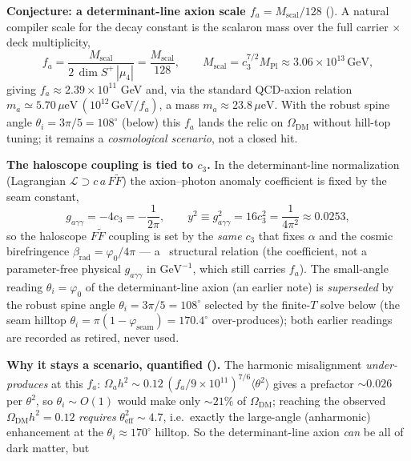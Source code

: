\documentclass[11pt,a4paper]{article}
\newcommand{\cthree}{c_3}
\newcommand{\Mpl}{M_{\mathrm{Pl}}}
\begin{document}
\par\smallskip\noindent\textbf{Conjecture: a determinant-line axion scale $f_a=M_{\mathrm{scal}}/128$} (\mC).
A natural compiler scale for the decay constant is the scalaron mass over the full carrier $\times$ deck
multiplicity,
\[
  f_a=\frac{M_{\mathrm{scal}}}{2\,\dim S^+\,|\mu_4|}=\frac{M_{\mathrm{scal}}}{128},\qquad
  M_{\mathrm{scal}}=\cthree^{7/2}\Mpl\approx3.06\times10^{13}\,\mathrm{GeV},
\]
giving $f_a\approx2.39\times10^{11}$ GeV and, via the standard QCD-axion relation
$m_a\simeq5.70\,\mu\mathrm{eV}\,(10^{12}\,\mathrm{GeV}/f_a)$, a mass $m_a\approx23.8\,\mu\mathrm{eV}$.
With the robust spine angle $\theta_i=3\pi/5=108^\circ$ (below) this $f_a$ lands the relic on
$\Omega_{\mathrm{DM}}$ without hill-top tuning; it remains a \emph{cosmological scenario}, not a closed
hit. 
\par\smallskip\noindent\textbf{The haloscope coupling is tied to $\cthree$.} In the determinant-line
normalization (Lagrangian $\mathcal L\supset c\,a\,F\tilde F$) the axion--photon anomaly coefficient is fixed
by the seam constant,
\[
  g_{a\gamma\gamma}=-4\cthree=-\frac{1}{2\pi},\qquad y^2\equiv g_{a\gamma\gamma}^2=16\cthree^2=\frac{1}{4\pi^2}\approx0.0253,
\]
so the haloscope $F\tilde F$ coupling is set by the \emph{same} $\cthree$ that fixes $\alpha$ and the cosmic
birefringence $\beta_{\mathrm{rad}}=\varphi_0/4\pi$ --- a \mC\ structural relation (the coefficient, not a
parameter-free physical $g_{a\gamma\gamma}$ in $\mathrm{GeV}^{-1}$, which still carries $f_a$). The
small-angle reading $\theta_i=\varphi_0$ of the determinant-line axion (an earlier note) is \emph{superseded}
by the robust spine angle $\theta_i=3\pi/5=108^\circ$ selected by the finite-$T$ solve below (the seam
hilltop $\theta_i=\pi(1-\varphi_{\mathrm{seam}})=170.4^\circ$ over-produces); both earlier readings are
recorded as retired, never used.
\par\smallskip\noindent\textbf{Why it stays a scenario, quantified ().}
The harmonic misalignment \emph{under-produces} at this $f_a$: $\Omega_a h^2\sim0.12\,(f_a/9{\times}10^{11})^{7/6}\langle\theta^2\rangle$
gives a prefactor ${\sim}0.026$ per $\theta^2$, so $\theta_i\sim O(1)$ would make only ${\sim}21\%$ of
$\Omega_{\mathrm{DM}}$; reaching the observed $\Omega_{\mathrm{DM}}h^2=0.12$ \emph{requires}
$\theta_{\mathrm{eff}}^2\sim4.7$, i.e.\ exactly the large-angle (anharmonic) enhancement at the
$\theta_i\approx170^\circ$ hilltop. So the determinant-line axion \emph{can} be all of dark matter, but
\end{document}
